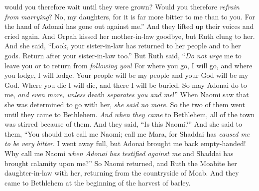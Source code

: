 \begin{biblechapter}
\verse would you therefore wait until they were grown? Would you therefore \textit{refrain from marrying}? No, my daughters, for it is far more bitter to me than to you. For the hand of Adonai has gone out against me.”
\verse And they lifted up their voices and cried again. And Orpah kissed her mother-in-law goodbye, but Ruth clung to her.
\verse And she said, “Look, your sister-in-law has returned to her people and to her gods. Return after your sister-in-law too.”
\verse But Ruth said, “\textit{Do not urge} me to leave you or to return from \textit{following you}! For where you go, I will go, and where you lodge, I will lodge. Your people will be my people and your God will be my God.
\verse Where you die I will die, and there I will be buried. So may Adonai do to me, \textit{and even more, unless} death \textit{separates you and me}!”
\verse When Naomi saw that she was determined to go with her, \textit{she said no more}.
\verse So the two of them went until they came to Bethlehem. \textit{And when they came} to Bethlehem, all of the town was stirred because of them. And they said, “Is this Naomi?”
\verse And she said to them, “You should not call me Naomi; call me Mara, for Shaddai has \textit{caused me to be very bitter}.
\verse I went away full, but Adonai brought me back empty-handed! Why call me Naomi \textit{when Adonai has testified against me} and Shaddai has brought calamity upon me?”
\verse So Naomi returned, and Ruth the Moabite her daughter-in-law with her, returning from the countryside of Moab. And they came to Bethlehem at the beginning of the harvest of barley.
\end{biblechapter}

